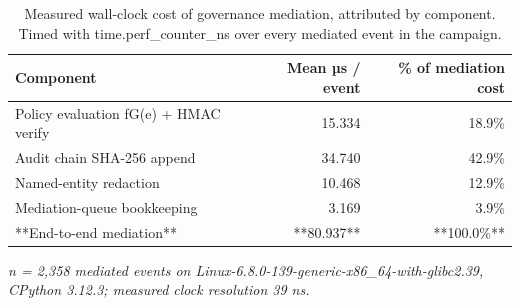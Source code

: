 \begin{table}[htbp]
\centering
\small
\caption{Measured wall-clock cost of governance mediation, attributed by component. Timed with time.perf\_counter\_ns over every mediated event in the campaign.}
\label{tab:gmais-8}
\begin{tabular}{lrr}
\toprule
Component & Mean µs / event & \% of mediation cost \\
\midrule
Policy evaluation fG(e) + HMAC verify & 15.334 & 18.9\% \\
Audit chain SHA-256 append & 34.740 & 42.9\% \\
Named-entity redaction & 10.468 & 12.9\% \\
Mediation-queue bookkeeping & 3.169 & 3.9\% \\
**End-to-end mediation** & **80.937** & **100.0\%** \\
\bottomrule
\end{tabular}
\par\vspace{2pt}\footnotesize\emph{n = 2,358 mediated events on Linux-6.8.0-139-generic-x86\_64-with-glibc2.39, CPython 3.12.3; measured clock resolution 39 ns.}
\end{table}
